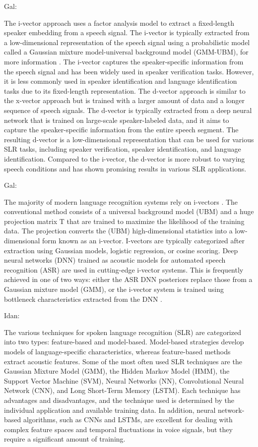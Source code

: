 \documentclass[a4paper]{article}
\begin{document}
Gal:

The i-vector approach uses a factor analysis model to extract a fixed-length speaker embedding from a speech signal. The i-vector is typically extracted from a low-dimensional representation of the speech signal using a probabilistic model called a Gaussian mixture model-universal background model (GMM-UBM), for more information \cite{morrison2011comparison}. The i-vector captures the speaker-specific information from the speech signal and has been widely used in speaker verification tasks. However, it is less commonly used in speaker identification and language identification tasks due to its fixed-length representation. The d-vector approach is similar to the x-vector approach but is trained with a larger amount of data and a longer sequence of speech signals. The d-vector is typically extracted from a deep neural network that is trained on large-scale speaker-labeled data, and it aims to capture the speaker-specific information from the entire speech segment. The resulting d-vector is a low-dimensional representation that can be used for various SLR tasks, including speaker verification, speaker identification, and language identification. Compared to the i-vector, the d-vector is more robust to varying speech conditions and has shown promising results in various SLR applications.


Gal:

The majority of modern language recognition systems rely on i-vectors
\cite{najim2011front}. The conventional method consists of a universal background model (UBM) and a huge projection matrix T that are trained to maximize the likelihood of the training data. The projection converts the (UBM) high-dimensional statistics into a low-dimensional form known as an i-vector. I-vectors are typically categorized after extraction using Gaussian models, logistic regression, or cosine scoring. Deep neural networks (DNN) trained as acoustic models for automated speech recognition (ASR) are used in cutting-edge i-vector systems. This is frequently achieved in one of two ways: either the ASR DNN posteriors replace those from a Gaussian mixture model (GMM), or the i-vector system is trained using bottleneck characteristics extracted from the DNN \cite{matejk2014neural,richardson2015neural}.

Idan:

The various techniques for spoken language recognition (SLR) are categorized into two types: feature-based and model-based. Model-based strategies develop models of language-specific characteristics, whereas feature-based methods extract acoustic features. Some of the most often used SLR techniques are the Gaussian Mixture Model (GMM), the Hidden Markov Model (HMM), the Support Vector Machine (SVM), Neural Networks (NN), Convolutional Neural Network (CNN), and Long Short-Term Memory (LSTM). Each technique has advantages and disadvantages, and the technique used is determined by the individual application and available training data. In addition, neural network-based algorithms, such as CNNs and LSTMs, are excellent for dealing with complex feature spaces and temporal fluctuations in voice signals, but they require a significant amount of training.
\end{document}
